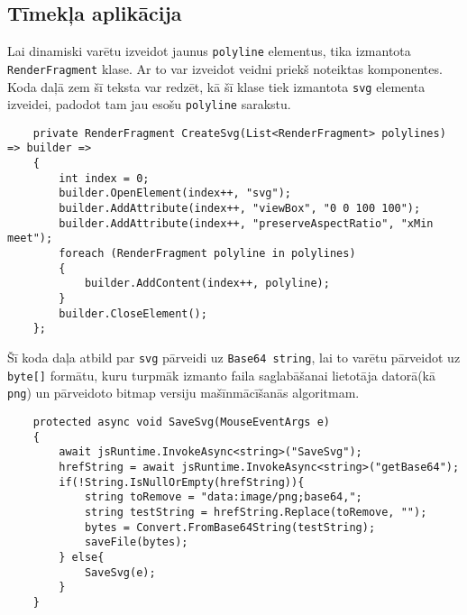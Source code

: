 \subsection{Tīmekļa aplikācija}

\par Lai dinamiski varētu izveidot jaunus \texttt{polyline} elementus, tika izmantota \texttt{RenderFragment} \cite{render_fragment}  klase. Ar to var izveidot veidni priekš noteiktas komponentes. Koda daļā zem šī teksta var redzēt, kā šī klase tiek izmantota \texttt{svg} elementa izveidei, padodot tam jau esošu \texttt{polyline} sarakstu.

{
\begin{verbatim}
    private RenderFragment CreateSvg(List<RenderFragment> polylines) => builder =>
    {
        int index = 0;
        builder.OpenElement(index++, "svg");
        builder.AddAttribute(index++, "viewBox", "0 0 100 100");
        builder.AddAttribute(index++, "preserveAspectRatio", "xMin meet");
        foreach (RenderFragment polyline in polylines)
        {
            builder.AddContent(index++, polyline);
        }
        builder.CloseElement();
    };
\end{verbatim}
}

\par Šī koda daļa atbild par \texttt{svg} pārveidi uz \texttt{Base64 string}, lai to varētu pārveidot uz \texttt{byte[]} \cite{from_base_64_to_string} formātu, kuru turpmāk izmanto faila saglabāšanai lietotāja datorā(kā \texttt{png}) un pārveidoto bitmap versiju mašīnmācīšanās algoritmam.
{
\begin{verbatim}
    protected async void SaveSvg(MouseEventArgs e)
    {
        await jsRuntime.InvokeAsync<string>("SaveSvg");
        hrefString = await jsRuntime.InvokeAsync<string>("getBase64");
        if(!String.IsNullOrEmpty(hrefString)){
            string toRemove = "data:image/png;base64,";
            string testString = hrefString.Replace(toRemove, "");
            bytes = Convert.FromBase64String(testString);
            saveFile(bytes);
        } else{
            SaveSvg(e);
        }
    }
\end{verbatim}
}

